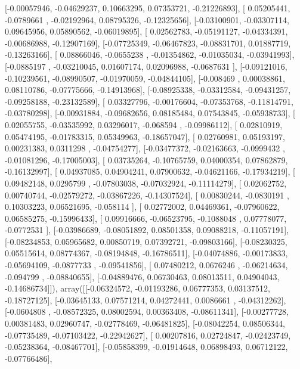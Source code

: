 \documentclass{article}
\begin{document}
       [-0.00057946, -0.04629237,  0.10663295,  0.07353721, -0.21226893],
       [ 0.05205441, -0.0789661 , -0.02192964,  0.08795326, -0.12325656],
       [-0.03100901, -0.03307114,  0.09645956,  0.05890562, -0.06019895],
       [ 0.02562783, -0.05191127, -0.04334391, -0.00686988, -0.12907169],
       [-0.07725349, -0.06467823, -0.08831701,  0.01887719, -0.13263166],
       [ 0.08866046, -0.0655238 , -0.01354862, -0.01035034, -0.03941993],
       [-0.0885197 , -0.03210045,  0.01607174,  0.02096988, -0.0687631 ],
       [-0.09121016, -0.10239561, -0.08990507, -0.01970059, -0.04844105],
       [-0.008469  ,  0.00038861,  0.08110786, -0.07775666, -0.14913968],
       [-0.08925338, -0.03312584, -0.09431257, -0.09258188, -0.23132589],
       [ 0.03327796, -0.00176604, -0.07353768, -0.11814791, -0.03780298],
       [-0.00931884, -0.09682656,  0.08185484,  0.07543845, -0.05938733],
       [ 0.02055755, -0.03535992,  0.03296017, -0.068594  , -0.09986112],
       [ 0.02810919,  0.05474195, -0.01783315,  0.05349963, -0.18657047],
       [ 0.02760981,  0.05193197,  0.00231383,  0.0311298 , -0.04754277],
       [-0.03477372, -0.02163663, -0.0999432 , -0.01081296, -0.17005003],
       [ 0.03735264, -0.10765759,  0.04000354,  0.07862879, -0.16132997],
       [ 0.04937085,  0.04904241,  0.07900632, -0.04621166, -0.17934219],
       [ 0.09482148,  0.0295799 , -0.07803038, -0.07032924, -0.11114279],
       [ 0.02062752,  0.00740744, -0.02579272, -0.03867226, -0.14307524],
       [ 0.00830244, -0.0830191 ,  0.10303223,  0.06521695, -0.058114  ],
       [ 0.02772002,  0.04469361, -0.07960622,  0.06585275, -0.15996433],
       [ 0.09916666, -0.06523795, -0.1088048 ,  0.07778077, -0.0772531 ],
       [-0.03986689, -0.08051892,  0.08501358,  0.09088218, -0.11057191],
       [-0.08234853,  0.05965682,  0.00850719,  0.07392721, -0.09803166],
       [-0.08230325,  0.05515614,  0.08774367, -0.08194848, -0.16786511],
       [-0.04074886, -0.00173833, -0.05694109, -0.0877733 , -0.09541856],
       [ 0.07480212,  0.0676246 , -0.06214634, -0.094799  , -0.08840655],
       [-0.04889476,  0.06730463,  0.08013511,  0.04904043, -0.14686734]]), array([[-0.06324572, -0.01193286,  0.06777353,  0.03137512, -0.18727125],
       [-0.03645133,  0.07571214,  0.04272441,  0.0086661 , -0.04312262],
       [-0.0604808 , -0.08572325,  0.08002594,  0.00363408, -0.08611341],
       [-0.00277728,  0.00381483,  0.02960747, -0.02778469, -0.06481825],
       [-0.08042254,  0.08506344, -0.07735489, -0.07103422, -0.22942627],
       [ 0.00207816,  0.02724847, -0.02423749, -0.05238364, -0.08467701],
       [-0.05858399, -0.01914648,  0.06898493,  0.06712122, -0.07766486],
\end{document}
